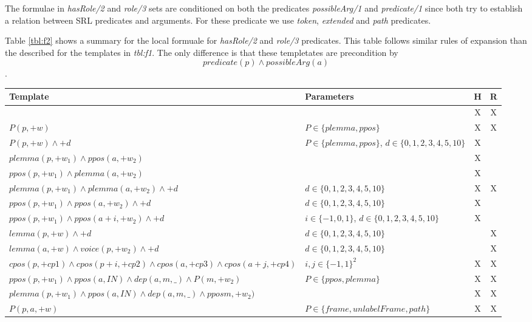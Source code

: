 The formulae in \emph{hasRole/2} and \emph{role/3} sets are conditioned on both 
the predicates \emph{possibleArg/1} and \emph{predicate/1} since both try 
to establish a relation between SRL predicates and arguments. For these predicate 
we use \emph{token}, \emph{extended} and \emph{path} predicates.

Table \ref{tbl:f2} shows a summary for the local formuale for \emph{hasRole/2} and \emph{role/3} predicates. This table follows similar rules of expansion than the described for the templates in \emph{tbl:f1}. The only difference is that these templetates are precondition by \[ predicate(p) \land possibleArg(a) \]. 
\begin{table*}
\centering
\begin{tabular}{|p{8cm}|p{4cm}|c|c|}\hline
   Template               & Parameters & H & R \\\hline
   $                 $    &                        & X & X \\
   $ P(p,+w)         $    & $P \in \{plemma,ppos\}$ & X & X \\
   $ P(p,+w) \land +d$    & $P \in \{plemma,ppos\}$, $d \in \{0,1,2,3,4,5,10\}$ & X &   \\
   $ plemma (p,+w_1) \land ppos(a,+w_2) $    & & X &  \\
   $ ppos(p,+w_1) \land plemma(a,+w_2) $    & & X &  \\
   $ plemma(p,+w_1) \land plemma(a,+w_2) \land +d $ & $d \in \{0,1,2,3,4,5,10\}$ & X & X \\
   $ ppos(p,+w_1) \land ppos(a,+w_2) \land +d $ & $d \in \{0,1,2,3,4,5,10\}$ & X &   \\
   $ ppos(p,+w_1) \land ppos(a+i,+w_2) \land +d $ & $i \in \{-1,0,1\}$, $d \in \{0,1,2,3,4,5,10\}$ & X &   \\
   $ lemma(p,+w) \land +d $ & $d \in \{0,1,2,3,4,5,10\}$ &  & X  \\
   $ lemma(a,+w) \land voice(p,+w_2) \land +d $ & $d \in \{0,1,2,3,4,5,10\}$ &  & X  \\
   $ cpos(p,+cp1) \land cpos(p+i,+cp2) \land cpos(a,+cp3) \land cpos(a+j,+cp4)$ & $i,j \in \{-1,1\}^2$ & X & X\\
   $ ppos(p,+w_1) \land ppos(a,IN) \land dep(a,m,\_) \land P(m,+w_2) $ & $P \in \{ppos, plemma \}$ & X &  X \\
   $ plemma(p,+w_1) \land ppos(a,IN) \land dep(a,m,\_) \land pposm,+w_2) $ & & X &  X \\
   $ P(p,a,+w)         $    & $P \in \{frame, unlabelFrame, path\}$ & X & X \\

\end{tabular}
\end{table*}
